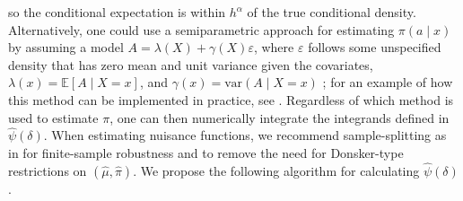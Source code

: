 \documentclass[11pt,twoside]{article}
\newcommand{\var}{\text{var}}
\theoremstyle{definition}
\theoremstyle{remark}
\begin{document}
so the conditional expectation is within $h^\alpha$ of the true conditional density. Alternatively, one could use a semiparametric approach for estimating $\pi(a \mid x)$ by assuming a model $A = \lambda(X) + \gamma(X) \varepsilon$, where $\varepsilon$ follows some unspecified density that has zero mean and unit variance given the covariates, $\lambda(x) = \mathbb{E}[A \mid X = x]$, and $\gamma(x) = \var(A \mid X = x)$ \citep{hansen2004nonparametric}; for an example of how this method can be implemented in practice, see \cite{kennedy2017cte}. Regardless of which method is used to estimate $\pi$, one can then  numerically integrate the integrands defined in $\widehat{\psi}(\delta)$. When estimating  nuisance functions, we recommend sample-splitting as in \cite{robins2008higher, zheng2010asymptotic, Chernozhukov2018} for finite-sample robustness and to remove the need for Donsker-type restrictions on $(\widehat{\mu}, \widehat{\pi})$. We propose the following algorithm for calculating $\widehat{\psi}(\delta)$.
\end{document}
